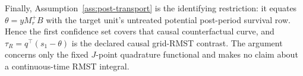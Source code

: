 Finally, Assumption~\ref{ass:post-transport} is the identifying restriction: it equates \(\theta=yM_r^+B\) with the target unit's untreated potential post-period survival row.  Hence the first confidence set covers that causal counterfactual curve, and \(\tau_R=q^\top(s_1-\theta)\) is the declared causal grid-RMST contrast.  The argument concerns only the fixed \(J\)-point quadrature functional and makes no claim about a continuous-time RMST integral.
